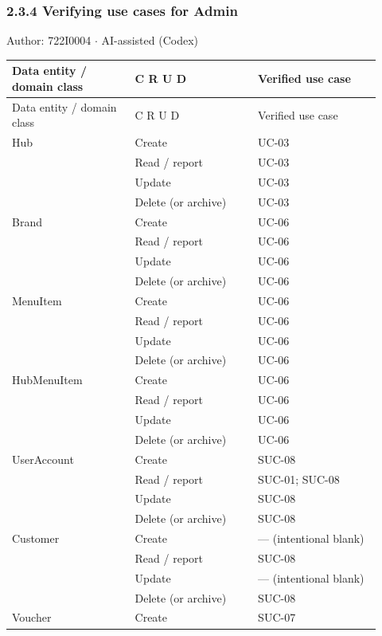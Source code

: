 \subsubsection*{2.3.4 Verifying use cases for Admin}
Author: 722I0004 \ensuremath{\cdot} AI-assisted (Codex)

\begin{longtable}{>{\raggedright\arraybackslash}p{0.3067\linewidth}>{\raggedright\arraybackslash}p{0.3067\linewidth}>{\raggedright\arraybackslash}p{0.3067\linewidth}}
Data entity / domain class & C R U D & Verified use case \\
\hline\endfirsthead
Data entity / domain class & C R U D & Verified use case \\
\hline\endhead
Hub & Create & UC-03 \\
 & Read / report & UC-03 \\
 & Update & UC-03 \\
 & Delete (or archive) & UC-03 \\
Brand & Create & UC-06 \\
 & Read / report & UC-06 \\
 & Update & UC-06 \\
 & Delete (or archive) & UC-06 \\
MenuItem & Create & UC-06 \\
 & Read / report & UC-06 \\
 & Update & UC-06 \\
 & Delete (or archive) & UC-06 \\
HubMenuItem & Create & UC-06 \\
 & Read / report & UC-06 \\
 & Update & UC-06 \\
 & Delete (or archive) & UC-06 \\
UserAccount & Create & SUC-08 \\
 & Read / report & SUC-01; SUC-08 \\
 & Update & SUC-08 \\
 & Delete (or archive) & SUC-08 \\
Customer & Create & --- (intentional blank) \\
 & Read / report & SUC-08 \\
 & Update & --- (intentional blank) \\
 & Delete (or archive) & SUC-08 \\
Voucher & Create & SUC-07 \\

\end{longtable}
